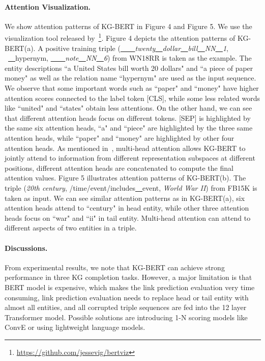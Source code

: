\documentclass[letterpaper]{article} \usepackage{aaai20}  \usepackage{times}  \usepackage{helvet} \usepackage{courier}  \usepackage[hyphens]{url}  \usepackage{graphicx} \urlstyle{rm} \def\UrlFont{\rm}  \usepackage{graphicx}  \usepackage{amsmath}
\begin{document}
\paragraph{Attention Visualization.}
We show attention patterns of KG-BERT in Figure 4 and Figure 5. We use the visualization tool released by~\cite{vig2019transformervis}\footnote{\url{https://github.com/jessevig/bertviz}}. Figure 4 depicts the attention patterns of KG-BERT(a). A positive training triple (\textit{\underline{~~~~}twenty\underline{~~}dollar\underline{~~}bill\underline{~~}NN\underline{~~}1}, ~\underline{~~}hypernym, \textit{\underline{~~~~}note\underline{~~}NN\underline{~~}6}) from WN18RR is taken as the example. The entity descriptions ``a United States bill worth 20 dollars" and ``a piece of paper money" as well as the relation name ``hypernym" are used as the input sequence. We observe that some important words such as ``paper" and ``money" have higher attention scores connected to the label token [CLS], while some less related words like ``united" and ``states" obtain less attentions. On the other hand, we can see that different attention heads focus on different tokens. [SEP] is highlighted by the same six attention heads, ``a" and ``piece" are highlighted by the three same attention heads, while ``paper" and ``money" are highlighted by other four attention heads. As mentioned in~\cite{vaswani2017attention}, multi-head attention allows KG-BERT to jointly attend to information from different representation subspaces at different positions, different attention heads are concatenated to compute the final attention values. 
Figure 5 illustrates attention patterns of KG-BERT(b). The triple (\textit{20th century}, /time/event/includes\underline{~~}event, \textit{World War II}) from FB15K is taken as input. We can see similar attention patterns as in KG-BERT(a), six attention heads attend to ``century" in head entity, while other three attention heads focus on ``war" and ``ii" in tail entity. Multi-head attention can attend to different aspects of two entities in a triple.

\paragraph{Discussions.}
From experimental results, we note that KG-BERT can achieve strong performance in three KG completion tasks. However, a major limitation is that BERT model is expensive, which makes the link prediction evaluation very time consuming, link prediction evaluation needs to replace head or tail entity with almost all entities, and all corrupted triple sequences are fed into the 12 layer Transformer model. Possible solutions are introducing 1-N scoring models like ConvE or using lightweight language models. 
 
\end{document}
